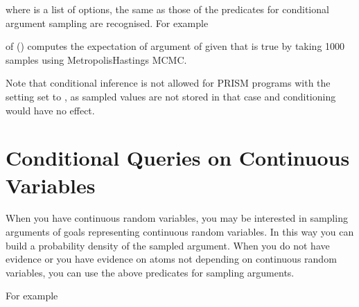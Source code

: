\documentclass[letterpaper,10pt,english]{sphinxmanual}
\begin{document}
\sphinxAtStartPar
where  is a list of options, the same as those of the predicates for conditional argument sampling are recognised. For example

\begin{sphinxVerbatim}[commandchars=\\\{\}]
 \PYG{p}{[}\PYG{p}{]}
\end{sphinxVerbatim}

\sphinxAtStartPar
of () computes the expectation of argument  of  given that  is true by taking 1000 samples using Metropolis\sphinxhyphen{}Hastings MCMC.

\sphinxAtStartPar
Note that conditional inference is not allowed for PRISM programs with the setting  set to , as sampled values are not stored in that case and conditioning would have no effect.


\section{Conditional Queries on Continuous Variables}
\label{\detokenize{index:conditional-queries-on-continuous-variables}}
\sphinxAtStartPar
When you have continuous random variables, you may be interested in sampling arguments of goals representing continuous random variables.
In this way you can build a probability density of the sampled argument.
When you do not have evidence or you have evidence on atoms not depending on continuous random variables, you can use the above predicates for sampling arguments.

\sphinxAtStartPar
For example

\begin{sphinxVerbatim}[commandchars=\\\{\}]
 
\end{sphinxVerbatim}
\end{document}

